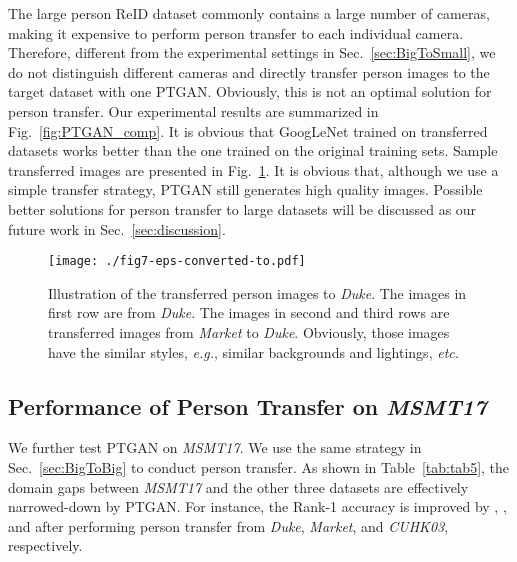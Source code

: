 \documentclass[10pt,twocolumn,letterpaper]{article}
\begin{document}
The large person ReID dataset commonly contains a large number of cameras, making it expensive to perform person transfer to each individual camera. Therefore, different from the experimental settings in Sec.~\ref{sec:BigToSmall}, we do not distinguish different cameras and directly transfer person images to the target dataset with one PTGAN. Obviously, this is not an optimal solution for person transfer. Our experimental results are summarized in Fig.~\ref{fig:PTGAN_comp}.
It is obvious that GoogLeNet trained on transferred datasets works better than the one trained on the original training sets. Sample transferred images are presented in Fig.~\ref{fig:fig7}. It is obvious that, although we use a simple transfer strategy, PTGAN still generates high quality images. Possible better solutions for person transfer to large datasets will be discussed as our future work in Sec.~\ref{sec:discussion}.

\begin{figure}
\begin{center}
\texttt{[image: ./fig7-eps-converted-to.pdf]}
\vspace{-2mm}
\end{center}
\caption{Illustration of the transferred person images to \emph{Duke}. The images in first row are from \emph{Duke}. The images in second and third rows are transferred images from \emph{Market} to \emph{Duke}. Obviously, those images have the similar styles, \emph{ e.g.}, similar backgrounds and lightings, \emph{etc.}}
\label{fig:fig7}
\end{figure}

\subsection{Performance of Person Transfer on \textbf{\emph{MSMT17}}}
\label{sec:pku}
We further test PTGAN on \emph{MSMT17}. We use the same strategy in Sec.~\ref{sec:BigToBig} to conduct person transfer. As shown in Table~\ref{tab:tab5}, the domain gaps between \emph{MSMT17} and the other three datasets are effectively narrowed-down by PTGAN. For instance, the Rank-1 accuracy is improved by , , and  after performing person transfer from \emph{Duke}, \emph{Market}, and \emph{CUHK03}, respectively.
\end{document}
